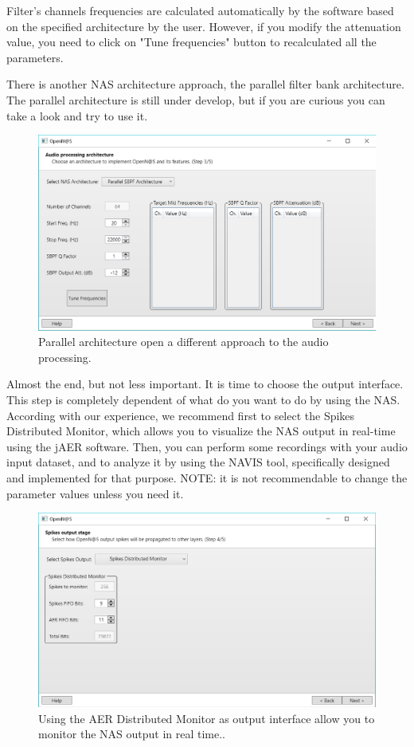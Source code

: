 Filter's channels frequencies are calculated automatically by the software based on the specified architecture by the user. However, if you modify the attenuation value, you need to click on "Tune frequencies" button to recalculated all the parameters.

There is another NAS architecture approach, the parallel filter bank architecture. The parallel architecture is still under develop, but if you are curious you can take a look and try to use it.

\begin{figure}[H]
\centering
\includegraphics[width=1\textwidth]{images/Img21_S3_Arch_bis.PNG}
\caption{\label{fig:OpenNAS_s3_parallel}Parallel architecture open a different approach to the audio processing.}
\end{figure}

Almost the end, but not less important. It is time to choose the output interface. This step is completely dependent of what do you want to do by using the NAS. According with our experience, we recommend first to select the Spikes Distributed Monitor, which allows you to visualize the NAS output in real-time using the jAER software. Then, you can perform some recordings with your audio input dataset, and to analyze it by using the NAVIS tool, specifically designed and implemented for that purpose. NOTE: it is not recommendable to change the parameter values unless you need it.

\begin{figure}[H]
\centering
\includegraphics[width=1\textwidth]{images/Img22_S4_OutInterface.PNG}
\caption{\label{fig:OpenNAS_s4_monitor}Using the AER Distributed Monitor as output interface allow you to monitor the NAS output in real time..}
\end{figure}

